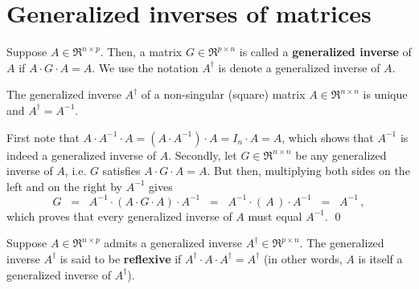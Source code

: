 

\section{Generalized inverses of matrices}
\setcounter{theorem}{0}
\setcounter{equation}{0}

\renewcommand{\theenumi}{\roman{enumi}}
\renewcommand{\labelenumi}{\textnormal{(\theenumi)}$\;\;$}


\begin{definition}
\mbox{}\vskip 0.1cm\noindent
Suppose $A \in \Re^{n \times p}$.
Then, a matrix $G \in \Re^{p \times n}$ is called a
\textbf{generalized inverse} of $A$ if
$A\cdot G\cdot A = A$.
We use the notation $A^{\dagger}$ is denote
a generalized inverse of $A$.
\end{definition}

\begin{proposition}
\label{GeneralizeInverseOfNonSingularMatrixIsUsualInverse}
\mbox{}\vskip 0.1cm\noindent
The generalized inverse $A^{\dagger}$ of a non-singular (square) matrix $A \in \Re^{n \times n}$
is unique and $A^{\dagger} = A^{-1}$. 
\end{proposition}
\proof
First note that $A \cdot A^{-1} \cdot A = (A \cdot A^{-1}) \cdot A = I_{n} \cdot A = A$,
which shows that $A^{-1}$ is indeed a generalized inverse of $A$.
Secondly, let $G \in \Re^{n \times n}$ be any generalized inverse of $A$, i.e.
$G$ satisfies $A \cdot G \cdot A = A$.
But then, multiplying both sides on the left and on the right by $A^{-1}$ gives
\begin{equation*}
G \;\; = \;\; A^{-1} \cdot (A \cdot G \cdot A) \cdot A^{-1}  
	\;\; = \;\; A^{-1} \cdot (\,A\,) \cdot A^{-1}  
	\;\; = \;\; A^{-1}\,,
\end{equation*}
which proves that every generalized inverse of $A$ must equal $A^{-1}$.
\qed

\begin{definition}
\mbox{}\vskip 0.1cm\noindent
Suppose $A \in \Re^{n \times p}$ admits a generalized inverse $A^{\dagger} \in \Re^{p \times n}$.
The generalized inverse $A^{\dagger}$ is said to be \textbf{reflexive} if
$A^{\dagger} \cdot A \cdot A^{\dagger} = A^{\dagger}$ (in other words,
$A$ is itself a generalized inverse of $A^{\dagger}$).
\end{definition}

